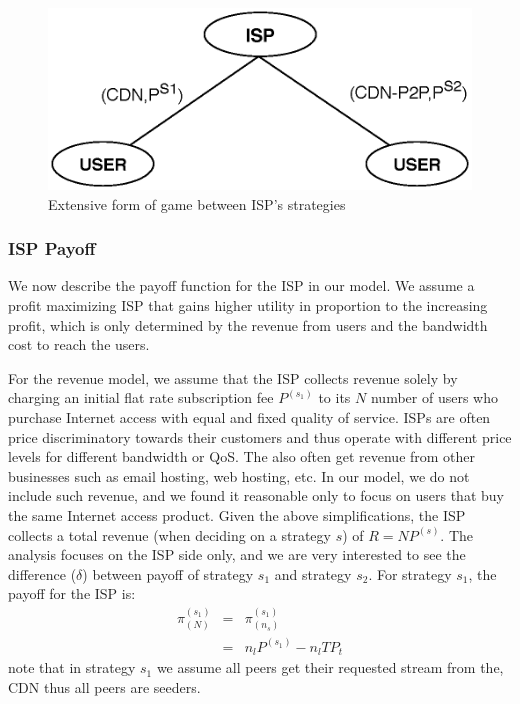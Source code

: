 \documentclass[paper]{ieice}
\begin{document}
\begin{figure}[tb] 
\begin{center}
\includegraphics[scale=0.5]{graphs/game-tree-2.eps}
\end{center}
\caption{Extensive form of game between ISP's strategies}
\label{fig:gametree}
\vspace{-2mm}
\end{figure}

\subsubsection{ISP Payoff}

We now describe the payoff function for the ISP in our model.  
We assume a profit maximizing ISP that gains higher utility in proportion to the increasing profit, which is only determined by the revenue from users and the bandwidth cost to reach the users.

For the revenue model, we assume that the ISP collects revenue solely
by charging an initial flat rate subscription fee $P^{(s_1)}$ to its
$N$ number of users who purchase Internet access with equal and fixed
quality of service.  ISPs are often price discriminatory towards their
customers and thus operate with different price levels for different
bandwidth or QoS.  The also often get revenue from other businesses
such as email hosting, web hosting, etc.  In our model, we do not
include such revenue, and we found it reasonable only to focus on
users that buy the same Internet access product.  Given the above
simplifications, the ISP collects a total revenue (when deciding on a
strategy $s$) of $R = N P^{(s)}$.  The analysis focuses on the ISP
side only, and we are very interested to see the difference ($\delta$)
between payoff of strategy $s_1$ and strategy $s_2$.  For strategy
$s_1$, the payoff for the ISP is:
\begin{eqnarray}
	\pi^{(s_1)}_{(N)}&=&\pi^{(s_1)}_{(n_s)}\\
	&=&n_l P^{(s_1)} - n_l T P_t
\end{eqnarray}
note that in strategy $s_1$ we assume all peers get their requested
stream from the, CDN thus all peers are seeders.
\end{document}
